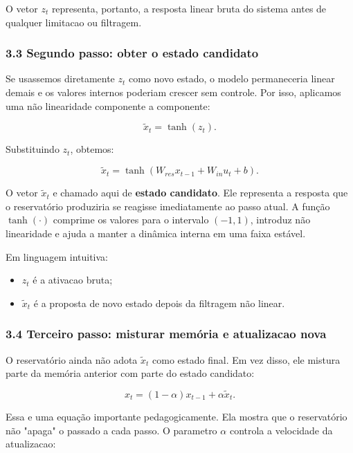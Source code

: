 \documentclass[12pt]{article}
\providecommand{\tightlist}{%
          \setlength{\itemsep}{0pt}\setlength{\parskip}{0pt}}
\begin{document}
O vetor \(z_t\) representa, portanto, a resposta linear bruta do sistema antes de qualquer limitacao ou filtragem.

\subsubsection{3.3 Segundo passo: obter o estado candidato}\label{33-segundo-passo-obter-o-estado-candidato}

Se usassemos diretamente \(z_t\) como novo estado, o modelo permaneceria linear demais e os valores internos poderiam crescer sem controle. Por isso, aplicamos uma não linearidade componente a componente:

\[
\widetilde{x}_t = \tanh(z_t).
\]

Substituindo \(z_t\), obtemos:

\[
\widetilde{x}_t = \tanh(W_{res} x_{t-1} + W_{in} u_t + b).
\]

O vetor \(\widetilde{x}_t\) e chamado aqui de \textbf{estado candidato}. Ele representa a resposta que o reservatório produziria se reagisse imediatamente ao passo atual. A função \(\tanh(\cdot)\) comprime os valores para o intervalo \((-1,1)\), introduz não linearidade e ajuda a manter a dinâmica interna em uma faixa estável.

Em linguagem intuitiva:

\begin{itemize}
\tightlist
\item
  \(z_t\) é a ativacao bruta;
\item
  \(\widetilde{x}_t\) é a proposta de novo estado depois da filtragem não linear.
\end{itemize}

\subsubsection{3.4 Terceiro passo: misturar memória e atualizacao nova}\label{34-terceiro-passo-misturar-memuxf3ria-e-atualizacao-nova}

O reservatório ainda não adota \(\widetilde{x}_t\) como estado final. Em vez disso, ele mistura parte da memória anterior com parte do estado candidato:

\[
x_t = (1 - \alpha) x_{t-1} + \alpha \widetilde{x}_t.
\]

Essa e uma equação importante pedagogicamente. Ela mostra que o reservatório não "apaga" o passado a cada passo. O parametro \(\alpha\) controla a velocidade da atualizacao:
\end{document}
